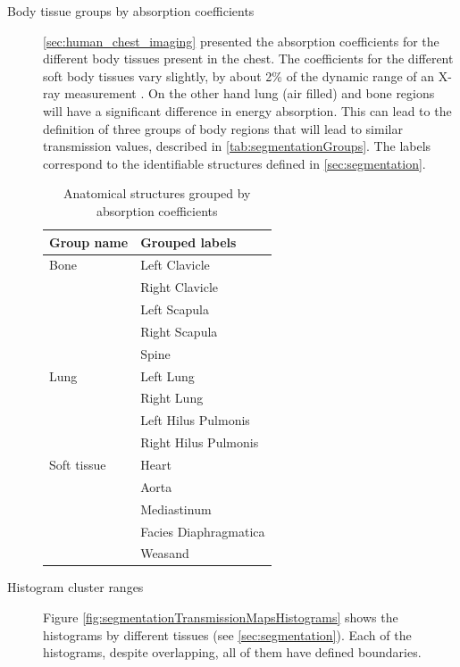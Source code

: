 \documentclass[nomenclature, english, bibtex]{kththesis}
\numberwithin{listing}{chapter}
\begin{document}
\begin{description}
    \item[Body tissue groups by absorption coefficients] \autoref{sec:human_chest_imaging} presented the absorption coefficients
    for the different body tissues present in the chest. The coefficients for the different soft body tissues
    vary slightly, by about 2\% of the dynamic range of an X-ray measurement \cite[p.~54]{epstein2008}. On the other hand
    lung (air filled) and bone regions will have a significant difference in energy absorption. This can lead to
    the definition of three groups of body regions that will lead to similar transmission values, described in
    \autoref{tab:segmentationGroups}. The labels correspond to the identifiable structures defined in \autoref{sec:segmentation}.

    \begin{table}[H]
        \centering
        \begin{tabular}{l l}
            \textbf{Group name} & \textbf{Grouped labels} \\
            \hline
            Bone &  Left Clavicle\\
                & Right Clavicle \\
                & Left Scapula\\
                &Right Scapula\\
                &Spine \\
            \hline
            Lung &  Left Lung \\
                & Right Lung \\
                & Left Hilus Pulmonis \\
                & Right Hilus Pulmonis \\
            \hline
            Soft tissue &  Heart \\
            & Aorta \\
            & Mediastinum \\
            & Facies Diaphragmatica \\
            & Weasand
        \end{tabular}
        \caption{Anatomical structures grouped by absorption coefficients}
        \label{tab:segmentationGroups}
    \end{table}
    \item[Histogram cluster ranges] Figure \ref{fig:segmentationTransmissionMapsHistograms} shows the histograms
    by different tissues (see \ref{sec:segmentation}). Each of the histograms, despite overlapping, all of them
    have defined boundaries.


\end{description}
\end{document}
